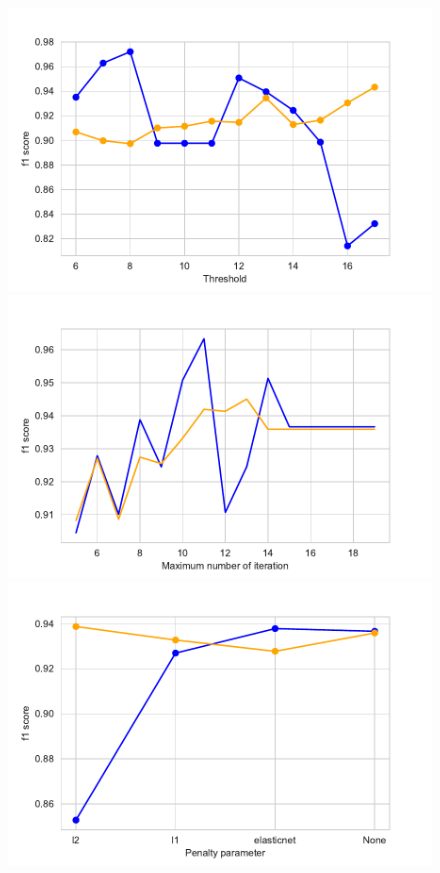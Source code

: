 \documentclass[11pt]{article}
\begin{document}
\begin{figure}
\begin{minipage}[l]{0.3\textwidth}
\includegraphics[width=1\linewidth]{voting/thresholds_ppn.pdf}
\end{minipage}
\begin{minipage}[l]{0.3\textwidth}
\includegraphics[width=1\linewidth]{voting/max_iter_ppn.pdf}
\end{minipage}
\begin{minipage}[l]{0.3\textwidth}
\includegraphics[width=1\linewidth]{voting/penalty_ppn.pdf}

\end{minipage}
\end{figure}
\end{document}
